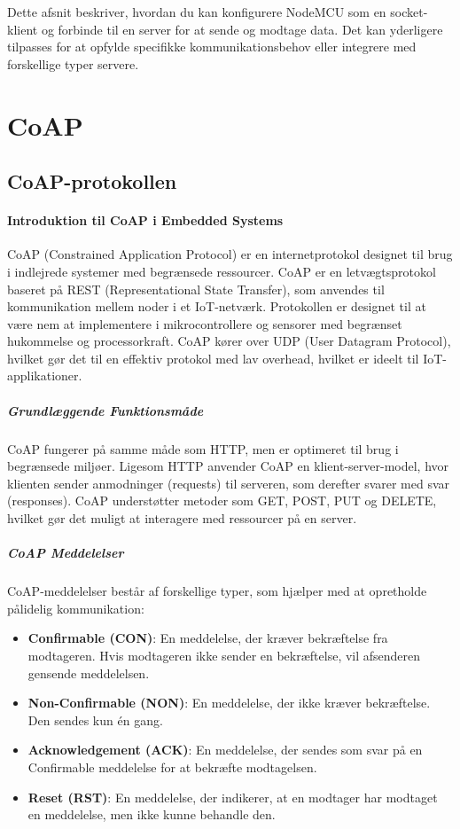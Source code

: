 Dette afsnit beskriver, hvordan du kan konfigurere NodeMCU som en socket-klient og forbinde til en server for at sende og modtage data. Det kan yderligere tilpasses for at opfylde specifikke kommunikationsbehov eller integrere med forskellige typer servere.

\chapter{CoAP}
\section{CoAP-protokollen}
\subsubsection{Introduktion til CoAP i Embedded Systems}
CoAP (Constrained Application Protocol) er en internetprotokol designet til brug i indlejrede systemer med begrænsede ressourcer. CoAP er en letvægtsprotokol baseret på REST (Representational State Transfer), som anvendes til kommunikation mellem noder i et IoT-netværk. Protokollen er designet til at være nem at implementere i mikrocontrollere og sensorer med begrænset hukommelse og processorkraft. CoAP kører over UDP (User Datagram Protocol), hvilket gør det til en effektiv protokol med lav overhead, hvilket er ideelt til IoT-applikationer.

\paragraph{Grundlæggende Funktionsmåde}
CoAP fungerer på samme måde som HTTP, men er optimeret til brug i begrænsede miljøer. Ligesom HTTP anvender CoAP en klient-server-model, hvor klienten sender anmodninger (requests) til serveren, som derefter svarer med svar (responses). CoAP understøtter metoder som GET, POST, PUT og DELETE, hvilket gør det muligt at interagere med ressourcer på en server.

\paragraph{CoAP Meddelelser}
CoAP-meddelelser består af forskellige typer, som hjælper med at opretholde pålidelig kommunikation:
\begin{itemize}
	\item \textbf{Confirmable (CON)}: En meddelelse, der kræver bekræftelse fra modtageren. Hvis modtageren ikke sender en bekræftelse, vil afsenderen gensende meddelelsen.
	\item \textbf{Non-Confirmable (NON)}: En meddelelse, der ikke kræver bekræftelse. Den sendes kun én gang.
	\item \textbf{Acknowledgement (ACK)}: En meddelelse, der sendes som svar på en Confirmable meddelelse for at bekræfte modtagelsen.
	\item \textbf{Reset (RST)}: En meddelelse, der indikerer, at en modtager har modtaget en meddelelse, men ikke kunne behandle den.
\end{itemize}

